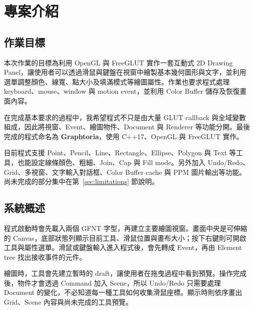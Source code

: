 \section{專案介紹}

\subsection{作業目標}

本次作業的目標為利用 OpenGL 與 FreeGLUT 實作一套互動式 2D Drawing Panel，讓使用者可以透過滑鼠與鍵盤在視窗中繪製基本幾何圖形與文字，並利用選單調整顏色、線寬、點大小及填滿模式等繪圖屬性。作業也要求程式處理 keyboard、mouse、window 與 motion event，並利用 Color Buffer 儲存及恢復畫面內容。

在完成基本要求的過程中，我希望程式不只是由大量 GLUT callback 與全域變數組成，因此將視窗、Event、繪圖物件、Document 與 Renderer 等功能分開。最後完成的程式命名為 \textbf{Graphtoria}，使用 C++17、OpenGL 與 FreeGLUT 實作。

目前程式支援 Point、Pencil、Line、Rectangle、Ellipse、Polygon 與 Text 等工具，也能設定線條顏色、粗細、Join、Cap 與 Fill mode。另外加入 Undo/Redo、Grid、多視窗、文字輸入對話框、Color Buffer cache 與 PPM 圖片輸出等功能。尚未完成的部分集中在第~\ref{sec:limitations} 節說明。

\subsection{系統概述}

程式啟動時會先載入兩個 GFNT 字型，再建立主要繪圖視窗。畫面中央是可伸縮的 Canvas，底部狀態列顯示目前工具、滑鼠位置與畫布大小；按下右鍵則可開啟工具與屬性選單。滑鼠或鍵盤輸入進入程式後，會先轉成 Event，再由 Element tree 找出接收事件的元件。

繪圖時，工具會先建立暫時的 draft，讓使用者在拖曳過程中看到預覽。操作完成後，物件才會透過 Command 加入 Scene，所以 Undo/Redo 只需要處理 Document 的變化，不必知道每一種工具如何收集滑鼠座標。顯示時則依序畫出 Grid、Scene 內容與尚未完成的工具預覽。
